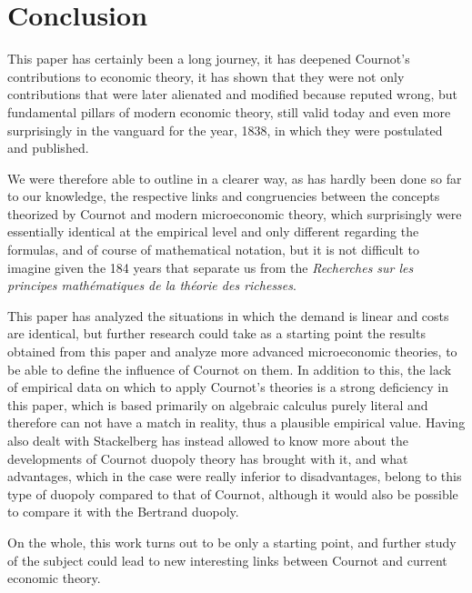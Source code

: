 \documentclass[12pt]{article}
\numberwithin{equation}{subsection}
\let\oldsection\section%
\renewcommand{\section}{%
  \renewcommand{\theequation}{\thesection.\arabic{equation}}%
  \oldsection}%
\begin{document}
\section{Conclusion}
This paper has certainly been a long journey, it has deepened Cournot's contributions to economic theory, it has shown that they were not only contributions that were later alienated and modified because reputed wrong, but fundamental pillars of modern economic theory, still valid today and even more surprisingly in the vanguard for the year, 1838, in which they were postulated and published. 

We were therefore able to outline in a clearer way, as has hardly been done so far to our knowledge, the respective links and congruencies between the concepts theorized by Cournot and modern microeconomic theory, which surprisingly were essentially identical at the empirical level and only different regarding the formulas, and of course of mathematical notation, but it is not difficult to imagine given the 184 years that separate us from the \emph{Recherches sur les principes mathématiques de la théorie des richesses}.

This paper has analyzed the situations in which the demand is linear and costs are identical, but further research could take as a starting point the results obtained from this paper and analyze more advanced microeconomic theories, to be able to define the influence of Cournot on them. In addition to this, the lack of empirical data on which to apply Cournot's theories is a strong deficiency in this paper, which is based primarily on algebraic calculus purely literal and therefore can not have a match in reality, thus a plausible empirical value. Having also dealt with Stackelberg has instead allowed to know more about the developments of Cournot duopoly theory has brought with it, and what advantages, which in the case were really inferior to disadvantages, belong to this type of duopoly compared to that of Cournot, although it would also be possible to compare it with the Bertrand duopoly.

On the whole, this work turns out to be only a starting point, and further study of the subject could lead to new interesting links between Cournot and current economic theory.

\newpage
{}
\setcounter{page}{3}



\newpage
\thispagestyle{empty}
\end{document}
